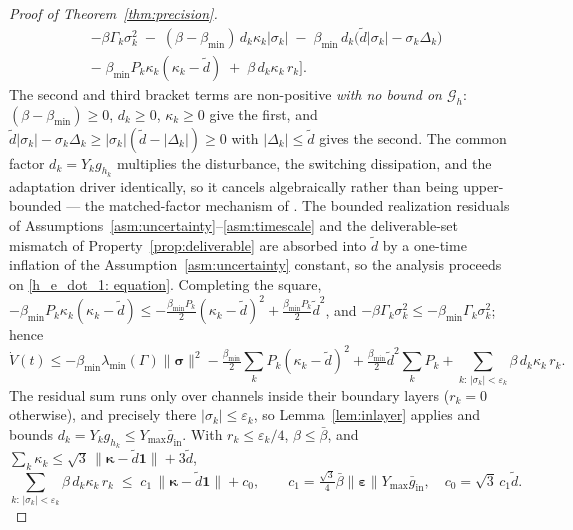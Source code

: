 \documentclass{IEEEtaes}
\theoremstyle{definition}
\theoremstyle{remark}
\begin{document}
\begin{proof}[Proof of Theorem~\ref{thm:precision}]
\begin{align}
&-\beta\Gamma_k\sigma_k^2
 \;-\;(\beta-\beta_{\min})\,d_k\kappa_k|\sigma_k|
 \;-\;\beta_{\min}\,d_k\big(\tilde{d}|\sigma_k|-\sigma_k\Delta_k\big) \nonumber\\
&-\;\beta_{\min}P_k\kappa_k(\kappa_k-\tilde{d})
 \;+\;\beta\,d_k\kappa_k\,r_k\Big].
\end{align}
The second and third bracket terms are non-positive \emph{with no bound on $\mathcal{G}_h$}: $(\beta-\beta_{\min})\ge0$, $d_k\ge0$, $\kappa_k\ge0$ give the first, and $\tilde{d}|\sigma_k|-\sigma_k\Delta_k\ge|\sigma_k|(\tilde{d}-|\Delta_k|)\ge0$ with $|\Delta_k|\le\tilde{d}$ gives the second. The common factor $d_k=Y_k g_{h_k}$ multiplies the disturbance, the switching dissipation, and the adaptation driver identically, so it cancels algebraically rather than being upper-bounded --- the matched-factor mechanism of \cite{singhal2025}. The bounded realization residuals of Assumptions~\ref{asm:uncertainty}--\ref{asm:timescale} and the deliverable-set mismatch of Property~\ref{prop:deliverable} are absorbed into $\tilde{d}$ by a one-time inflation of the Assumption~\ref{asm:uncertainty} constant, so the analysis proceeds on \eqref{h_e_dot_1: equation}. Completing the square, $-\beta_{\min}P_k\kappa_k(\kappa_k-\tilde{d})\le-\tfrac{\beta_{\min}P_k}{2}(\kappa_k-\tilde{d})^2+\tfrac{\beta_{\min}P_k}{2}\tilde{d}^2$, and $-\beta\Gamma_k\sigma_k^2\le-\beta_{\min}\Gamma_k\sigma_k^2$; hence
\begin{equation} \label{Vdot pre: equation}
\dot{V}(t)\le
 -\beta_{\min}\lambda_{\min}(\Gamma)\|\boldsymbol{\sigma}\|^2
 -\tfrac{\beta_{\min}}{2}\!\sum_k P_k(\kappa_k-\tilde{d})^2
 +\tfrac{\beta_{\min}}{2}\tilde{d}^2\!\sum_k P_k
 +\!\!\!\sum_{k:\,|\sigma_k|<\varepsilon_k}\!\!\!\beta\,d_k\kappa_k\,r_k .
\end{equation}
The residual sum runs only over channels inside their boundary layers ($r_k=0$ otherwise), and precisely there $|\sigma_k|\le\varepsilon_k$, so Lemma~\ref{lem:inlayer} applies and bounds $d_k=Y_k g_{h_k}\le Y_{\max}\bar{g}_\text{in}$. With $r_k\le\varepsilon_k/4$, $\beta\le\bar{\beta}$, and $\sum_k\kappa_k\le\sqrt3\,\|\boldsymbol{\kappa}-\tilde{d}\boldsymbol{1}\|+3\tilde{d}$,
\begin{equation} \label{residual bound: equation}
\sum_{k:\,|\sigma_k|<\varepsilon_k}\!\!\!\beta\,d_k\kappa_k\,r_k
 \;\le\; c_1\,\|\boldsymbol{\kappa}-\tilde{d}\boldsymbol{1}\| + c_0,\qquad
 c_1=\tfrac{\sqrt3}{4}\bar{\beta}\|\boldsymbol{\varepsilon}\|Y_{\max}\bar{g}_\text{in},\quad c_0=\sqrt3\,c_1\tilde{d}.
\end{equation}

\end{proof}
\end{document}
